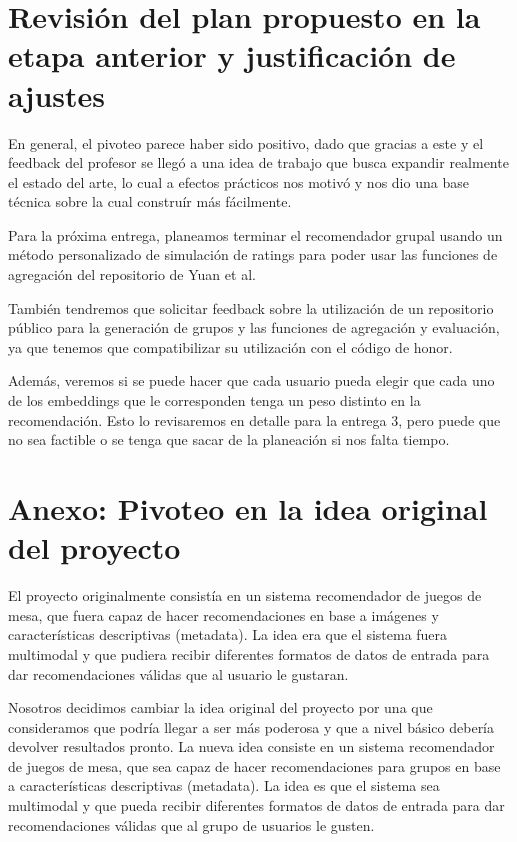 \documentclass[11pt]{article}
\begin{document}
\section{Revisión del plan propuesto en la etapa anterior y justificación de ajustes} 

En general, el pivoteo parece haber sido positivo, dado que gracias a este y el feedback del profesor se llegó a una idea de trabajo que busca expandir realmente el estado del arte, lo cual a efectos prácticos nos motivó y nos dio una base técnica sobre la cual construír más fácilmente.

Para la próxima entrega, planeamos terminar el recomendador grupal usando un método personalizado de simulación de ratings para poder usar las funciones de agregación del repositorio de Yuan et al.

También tendremos que solicitar feedback sobre la utilización de un repositorio público para la generación de grupos y las funciones de agregación y evaluación, ya que tenemos que compatibilizar su utilización con el código de honor.

Además, veremos si se puede hacer que cada usuario pueda elegir que cada uno de los embeddings que le corresponden tenga un peso distinto en la recomendación. Esto lo revisaremos en detalle para la entrega 3, pero puede que no sea factible o se tenga que sacar de la planeación si nos falta tiempo.

\newpage

\section{Anexo: Pivoteo en la idea original del proyecto}

El proyecto originalmente consistía en un sistema recomendador de juegos de mesa, que fuera capaz de hacer recomendaciones en base a imágenes y características descriptivas (metadata). La idea era que el sistema fuera multimodal y que pudiera recibir diferentes formatos de datos de entrada para dar recomendaciones válidas que al usuario le gustaran. 

Nosotros decidimos cambiar la idea original del proyecto por una que consideramos que podría llegar a ser más poderosa y que a nivel básico debería devolver resultados pronto. La nueva idea consiste en un sistema recomendador de juegos de mesa, que sea capaz de hacer recomendaciones para grupos en base a características descriptivas (metadata). La idea es que el sistema sea multimodal y que pueda recibir diferentes formatos de datos de entrada para dar recomendaciones válidas que al grupo de usuarios le gusten.
\end{document}
